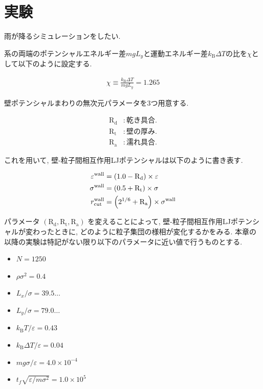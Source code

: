 \section{実験}

雨が降るシミュレーションをしたい.

系の両端のポテンシャルエネルギー差$mgL_y$と運動エネルギー差$k_{\text{B}}\Delta T$の比を$\chi$として以下のように設定する.

\begin{align}
  \chi \equiv \frac{k_{\text{B}}\Delta T}{mgL_{y}} = 1.265
\end{align}

壁ポテンシャルまわりの無次元パラメータを3つ用意する.

\begin{align}
  \text{R}_\text{d} &: 乾き具合. \\
  \text{R}_\text{t} &: 壁の厚み. \\
  \text{R}_\text{a} &: 濡れ具合.
\end{align}

これを用いて, 壁-粒子間相互作用LJポテンシャルは以下のように書き表す.

\begin{align}
  \varepsilon^{\text{wall}} &= \qty(1.0 - \text{R}_\text{d}) \times \varepsilon \\
  \sigma^{\text{wall}} &= \qty(0.5 + \text{R}_\text{t}) \times \sigma \\
  r^{\text{wall}}_{\text{cut}} &= \qty(2^{1/6} + \text{R}_\text{a}) \times \sigma^{\text{wall}}
\end{align}

パラメータ $(\text{R}_\text{d}, \text{R}_\text{t}, \text{R}_\text{a})$ を変えることによって, 壁-粒子間相互作用LJポテンシャルが変わったときに, どのように粒子集団の様相が変化するかをみる. 本章の以降の実験は特記がない限り以下のパラメータに近い値で行うものとする. 

\begin{itemize}
  \item $N = 1250$
  \item $\rho {\sigma}^2 = 0.4$
  \item $L_x / \sigma = 39.5\dots$
  \item $L_y / \sigma = 79.0\dots$
  \item $k_{\text{B}} T / \varepsilon = 0.43$
  \item $k_{\text{B}} \Delta T / \varepsilon = 0.04$
  \item $mg\sigma/\varepsilon = 4.0 \times 10^{-4}$
  \item $t_f \sqrt{\varepsilon / m \sigma^2} = 1.0 \times 10^{5}$
\end{itemize}


